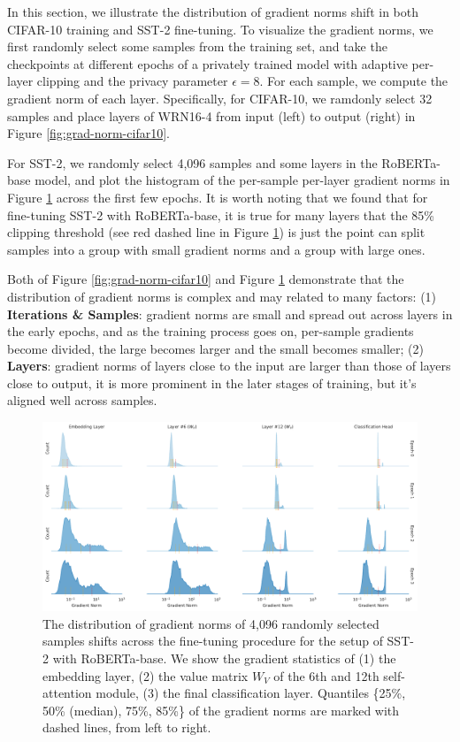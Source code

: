 In this section, we illustrate the distribution of gradient norms shift in both CIFAR-10 training and SST-2 fine-tuning. To visualize the gradient norms, we first randomly select some samples from the training set, and take the checkpoints at different epochs of a privately trained  model with adaptive per-layer clipping and the privacy parameter $\epsilon=8$. For each sample, we compute the gradient norm of each layer. Specifically, for CIFAR-10, we ramdonly select 32 samples and place layers of WRN16-4 from input (left) to output (right) in Figure \ref{fig:grad-norm-cifar10}. %

For SST-2, we randomly select 4,096 samples and some  layers in the RoBERTa-base model, and plot the histogram of the per-sample per-layer gradient norms in Figure \ref{fig:gnorm_distribution_sst2}  across the first few epochs. It is worth noting that we found that for fine-tuning SST-2 with RoBERTa-base, it is true for many layers that the 85\% clipping threshold (see red dashed line in Figure \ref{fig:gnorm_distribution_sst2}) is just the point can split samples into a group with small gradient norms and a group with large ones.

Both of Figure \ref{fig:grad-norm-cifar10} and Figure \ref{fig:gnorm_distribution_sst2} demonstrate that the distribution of gradient norms  is complex and may related to many factors: (1) \textbf{Iterations \& Samples}: gradient norms are small and spread out across layers in the early epochs, and 
as the training process goes on, per-sample gradients become divided, the large becomes larger and the small becomes smaller; %
(2) \textbf{Layers}: gradient norms of layers close to the input are larger than those of layers close to output, it is more prominent in the later stages of training, but it's aligned well across samples. %





\begin{figure}[!ht]
    \centering
    \includegraphics[width=0.95\linewidth]{files/fig/gnorm_hist_sst2_notext.pdf}
    \caption{The distribution of gradient norms of 4,096 randomly selected samples shifts across the fine-tuning procedure for the setup of SST-2 with RoBERTa-base. We show the gradient statistics of (1) the embedding layer, (2) the value matrix $W_V$ of the 6th and 12th self-attention module, (3) the final classification layer. Quantiles \{25\%, 50\% (median), 75\%, 85\%\} of the gradient norms are marked with dashed lines, from left to right.}
    \label{fig:gnorm_distribution_sst2}
\end{figure}

